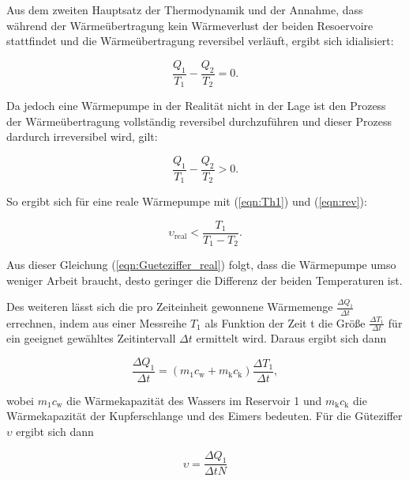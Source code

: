         Aus dem zweiten Hauptsatz der Thermodynamik und der Annahme, dass während der Wärmeübertragung kein Wärmeverlust der beiden Resoervoire stattfindet
         und die Wärmeübertragung reversibel verläuft, ergibt sich idialisiert:

        \begin{equation}
            \frac{Q_1}{T_1} - \frac{Q_2}{T_2} = 0.
            \label{eqn:irev}
        \end{equation}
        
        Da jedoch eine Wärmepumpe in der Realität nicht in der Lage ist den Prozess der Wärmeübertragung vollständig reversibel durchzuführen und dieser Prozess dardurch irreversibel wird, gilt:

        \begin{equation}
            \frac{Q_1}{T_1} - \frac{Q_2}{T_2} > 0.
            \label{eqn:rev}
        \end{equation}

        So ergibt sich für eine reale Wärmepumpe mit (\ref{eqn:Th1}) und (\ref{eqn:rev}):

        \begin{equation}
            \upsilon_\text{real} < \frac{T_1}{T_1 - T_2}.
            \label{eqn:Gueteziffer_real}
        \end{equation}

        Aus dieser Gleichung (\ref{eqn:Gueteziffer_real}) folgt, dass die Wärmepumpe umso weniger Arbeit braucht, desto geringer die Differenz der beiden Temperaturen ist.

        Des weiteren lässt sich die pro Zeiteinheit gewonnene Wärmemenge $\frac{\Delta Q_1}{\Delta t}$ errechnen, 
        indem aus einer Messreihe $T_1$ als Funktion der Zeit t die Größe $\frac{\Delta T_1}{\Delta t}$ für ein geeignet gewähltes Zeitintervall $\Delta t$ ermittelt wird.
        Daraus ergibt sich dann 

        \begin{equation}
        \frac{\Delta Q_1}{\Delta t} = (m_1 c_\text{w} + m_\text{k} c_\text{k}) \frac{\Delta T_1}{\Delta t},
        \end{equation}

        wobei $m_1 c_\text{w}$ die Wärmekapazität des Wassers im Reservoir 1 und $m_\text{k} c_\text{k}$ die Wärmekapazität der Kupferschlange und des Eimers bedeuten.
        Für die Güteziffer $\upsilon$ ergibt sich dann

        \begin{equation}
        \upsilon = \frac{\Delta Q_1}{\Delta t N}
        \end{equation}

